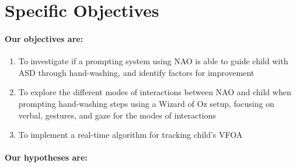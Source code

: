 \section{Specific Objectives}

\paragraph{Our objectives are:}
\begin{enumerate}
	\item To investigate if a prompting system using NAO is able to guide child with ASD through hand-washing, and identify factors for improvement
	
	\item To explore the different modes of interactions between NAO and child when prompting hand-washing steps using a Wizard of Oz setup, focusing on verbal, gestures, and gaze for the modes of interactions
	
	\item To implement a real-time algorithm for tracking child's VFOA
\end{enumerate}



\paragraph{Our hypotheses are:}









